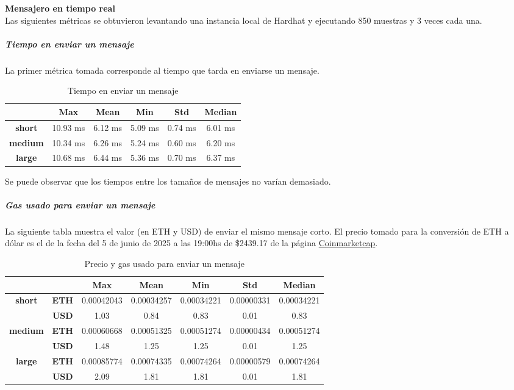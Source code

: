 \textbf{Mensajero en tiempo real}\\

Las siguientes métricas se obtuvieron levantando una instancia local de Hardhat \cite{hardhat} y ejecutando 850 muestras y 3 veces cada una.

\subparagraph{Tiempo en enviar un mensaje}

La primer métrica tomada corresponde al tiempo que tarda en enviarse un mensaje.

\setlength\tabcolsep{10pt}
\begin{table}[!htbp]
    \centering
    \begin{tabular}{|c|c|c|c|c|c|}
    \hline
    & \textbf{Max} & \textbf{Mean} & \textbf{Min} & \textbf{Std} & \textbf{Median} \\
    \hline
    \textbf{short} & 10.93 ms & 6.12 ms & 5.09 ms & 0.74 ms & 6.01 ms \\
    \hline
    \textbf{medium} & 10.34 ms & 6.26 ms & 5.24 ms & 0.60 ms & 6.20 ms \\
    \hline
    \textbf{large} & 10.68 ms & 6.44 ms & 5.36 ms & 0.70 ms & 6.37 ms \\
    \hline
    \end{tabular}
    \caption{Tiempo en enviar un mensaje}
\end{table}

Se puede observar que los tiempos entre los tamaños de mensajes no varían demasiado.

\subparagraph{Gas usado para enviar un mensaje}

La siguiente tabla muestra el valor (en ETH y USD) de enviar el mismo mensaje corto. El precio tomado para la conversión de ETH a dólar es el de la fecha del 5 de junio de 2025 a las 19:00hs de \$2439.17 de la página \href{https://coinmarketcap.com/currencies/ethereum/}{Coinmarketcap}.

\setlength\tabcolsep{10pt}
\begin{table}[H]
    \centering
    \begin{tabular}{|c|c|c|c|c|c|c|}
    \hline
    & & \textbf{Max} & \textbf{Mean} & \textbf{Min} & \textbf{Std} & \textbf{Median} \\
    \hline
    \multirow{2}{*}{\textbf{short}} & \textbf{ETH} & 0.00042043 & 0.00034257 & 0.00034221 & 0.00000331 & 0.00034221 \\
    \cline{2-7}
    & \textbf{USD} & 1.03 & 0.84 & 0.83 & 0.01 & 0.83 \\
    \hline
    \multirow{2}{*}{\textbf{medium}} & \textbf{ETH} & 0.00060668 & 0.00051325 & 0.00051274 & 0.00000434 & 0.00051274 \\
    \cline{2-7}
    & \textbf{USD} & 1.48 & 1.25 & 1.25 & 0.01 & 1.25 \\
    \hline
    \multirow{2}{*}{\textbf{large}} & \textbf{ETH} & 0.00085774 & 0.00074335 & 0.00074264 & 0.00000579 & 0.00074264 \\
    \cline{2-7}
    & \textbf{USD} & 2.09 & 1.81 & 1.81 & 0.01 & 1.81 \\
    \hline
    \end{tabular}
    \caption{Precio y gas usado para enviar un mensaje}
\end{table}

